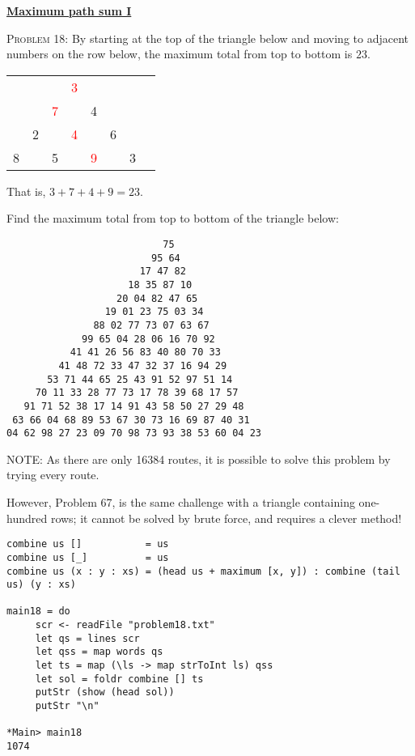 \documentclass[11pt]{article}
\begin{document}
\par\bigskip\noindent
\href{https://projecteuler.net/problem=18}{\textbf{Maximum path sum I}}\par\noindent
\textsc{Problem 18:}
By starting at the top of the triangle below and moving to adjacent numbers on the row below, the maximum total from top to bottom is $23$.
\par\medskip
\begin{tabular}{cccccccc}
    &  & & \textcolor{red}{3} &   & & &\\
    &  &\textcolor{red}{7}&  &  4 & & &\\
    &2&   &\textcolor{red}{4}&   &6 & &\\
  8& & 5 &  &\textcolor{red}{9}&   & 3
\end{tabular}
\par\bigskip
That is, $3 + 7 + 4 + 9 = 23$.
\par
Find the maximum total from top to bottom of the triangle below:
\par{\tiny
\begin{verbatim}
                           75
                         95 64
                       17 47 82
                     18 35 87 10
                   20 04 82 47 65
                 19 01 23 75 03 34
               88 02 77 73 07 63 67
             99 65 04 28 06 16 70 92
           41 41 26 56 83 40 80 70 33
         41 48 72 33 47 32 37 16 94 29
       53 71 44 65 25 43 91 52 97 51 14
     70 11 33 28 77 73 17 78 39 68 17 57
   91 71 52 38 17 14 91 43 58 50 27 29 48
 63 66 04 68 89 53 67 30 73 16 69 87 40 31
04 62 98 27 23 09 70 98 73 93 38 53 60 04 23
\end{verbatim}
}
\par\bigskip
NOTE: As there are only 16384 routes, it is possible to solve this problem by trying every route.\par
However, Problem 67, is the same challenge with a triangle containing one-hundred rows; it cannot be solved by brute force, and requires a clever method! 
\par
\begin{lstlisting}
combine us []           = us
combine us [_]          = us
combine us (x : y : xs) = (head us + maximum [x, y]) : combine (tail us) (y : xs)

main18 = do
     scr <- readFile "problem18.txt" 
     let qs = lines scr
     let qss = map words qs
     let ts = map (\ls -> map strToInt ls) qss
     let sol = foldr combine [] ts
     putStr (show (head sol))
     putStr "\n"

*Main> main18
1074
\end{lstlisting}
\end{document}
